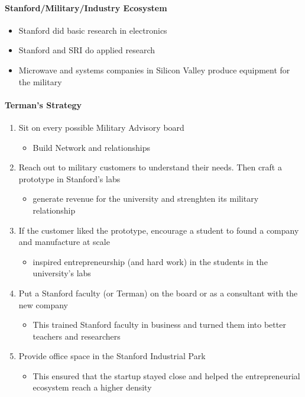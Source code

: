 \paragraph{Stanford/Military/Industry Ecosystem}

\begin{itemize}
    \item Stanford did basic research in electronics
    \item Stanford and SRI do applied research
    \item Microwave and systems companies in Silicon Valley produce equipment
        for the military
\end{itemize}

\paragraph{Terman's Strategy}

\begin{enumerate}
    \item Sit on every possible Military Advisory board
        \begin{itemize}
            \item Build Network and relationships
        \end{itemize}
    \item Reach out to military customers to understand their needs. Then craft
        a prototype in Stanford's labs
        \begin{itemize}
            \item generate revenue for the university and strenghten its
                military relationship
        \end{itemize}
    \item If the customer liked the prototype, encourage a student to found
        a company and manufacture at scale
        \begin{itemize}
            \item inspired entrepreneurship (and hard work) in the students in
                the university's labs
        \end{itemize}
    \item Put a Stanford faculty (or Terman) on the board or as a consultant
        with the new company
        \begin{itemize}
            \item This trained Stanford faculty in business and turned them into
                better teachers and researchers
        \end{itemize}
    \item Provide office space in the Stanford Industrial Park
        \begin{itemize}
            \item This ensured that the startup stayed close and helped the
                entrepreneurial ecosystem reach a higher density
        \end{itemize}
\end{enumerate}

